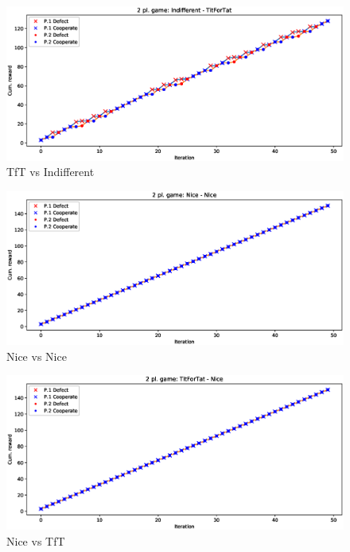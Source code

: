 \documentclass[journal,10pt,twoside]{IEEEtran}
\begin{document}
\begin{figure}[!ht]
    \centering
    \includegraphics[width=.9\columnwidth]{../img/ipd2p/ipd2p-rewards-Indifferent-TitForTat}
    \caption{TfT vs Indifferent}
    \label{fig:tftvsindiff}
\end{figure}

\begin{figure}[!ht]
    \centering
    \includegraphics[width=.9\columnwidth]{../img/ipd2p/ipd2p-rewards-Nice-Nice}
    \caption{Nice vs Nice}
    \label{fig:nicevsnice}
\end{figure}

\begin{figure}[!ht]
    \centering
    \includegraphics[width=.9\columnwidth]{../img/ipd2p/ipd2p-rewards-TitForTat-Nice}
    \caption{Nice vs TfT}
    \label{fig:nicevstft}
\end{figure}
\end{document}
